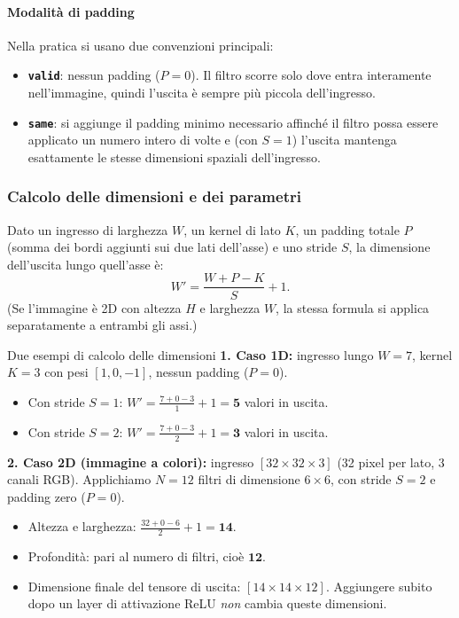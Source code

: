 \documentclass[12pt]{extarticle}
\begin{document}
\paragraph{Modalità di padding}
Nella pratica si usano due convenzioni principali:
\begin{itemize}
    \item \textbf{\texttt{valid}}: nessun padding ($P=0$). Il filtro scorre solo dove entra interamente nell'immagine, quindi l'uscita è sempre più piccola dell'ingresso.
    \item \textbf{\texttt{same}}: si aggiunge il padding minimo necessario affinché il filtro possa essere applicato un numero intero di volte e (con $S=1$) l'uscita mantenga esattamente le stesse dimensioni spaziali dell'ingresso.
\end{itemize}

\subsubsection{Calcolo delle dimensioni e dei parametri}

\noindent Dato un ingresso di larghezza $W$, un kernel di lato $K$, un padding totale $P$ (somma dei bordi aggiunti sui due lati dell'asse) e uno stride $S$, la dimensione dell'uscita lungo quell'asse è:
\[
W' = \frac{W + P - K}{S} + 1.
\]
(Se l'immagine è 2D con altezza $H$ e larghezza $W$, la stessa formula si applica separatamente a entrambi gli assi.)

\begin{esempiobox}{Due esempi di calcolo delle dimensioni}
\textbf{1. Caso 1D:} ingresso lungo $W=7$, kernel $K=3$ con pesi $[1,0,-1]$, nessun padding ($P=0$).
\begin{itemize}
    \item Con stride $S=1$: $W' = \frac{7 + 0 - 3}{1} + 1 = \mathbf{5}$ valori in uscita.
    \item Con stride $S=2$: $W' = \frac{7 + 0 - 3}{2} + 1 = \mathbf{3}$ valori in uscita.
\end{itemize}

\smallskip\noindent\textbf{2. Caso 2D (immagine a colori):} ingresso $[32\times 32\times 3]$ (32 pixel per lato, 3 canali RGB). Applichiamo $N=12$ filtri di dimensione $6\times 6$, con stride $S=2$ e padding zero ($P=0$).
\begin{itemize}
    \item Altezza e larghezza: $\frac{32 + 0 - 6}{2} + 1 = \mathbf{14}$.
    \item Profondità: pari al numero di filtri, cioè $\mathbf{12}$.
    \item Dimensione finale del tensore di uscita: $[14\times 14\times 12]$. Aggiungere subito dopo un layer di attivazione ReLU \emph{non} cambia queste dimensioni.
\end{itemize}
\end{esempiobox}
\end{document}
